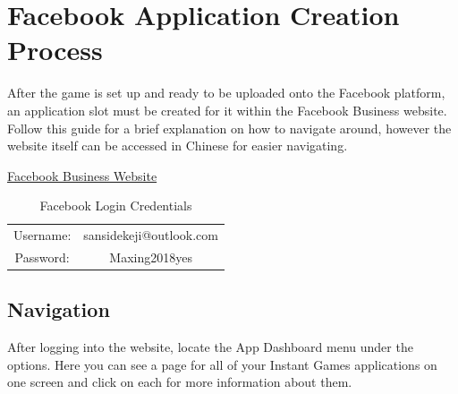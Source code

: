 \documentclass{article}
\begin{document}
\section{Facebook Application Creation Process}
After the game is set up and ready to be uploaded onto the Facebook platform, an application slot must be created for it within the Facebook Business website. Follow this guide for a brief explanation on how to navigate around, however the website itself can be accessed in Chinese for easier navigating.

\vspace{.2cm}
\begin{center}
\href{https://business.facebook.com}{Facebook Business Website}
\end{center}

\begin{table}[h]
\begin{center}
\begin{tabular}{c|c}
Username: \hspace{1cm} & sansidekeji@outlook.com \\
Password: \hspace{1cm} & Maxing2018yes 
\end{tabular}
\caption{Facebook Login Credentials}
\end{center}
\end{table}

\subsection{Navigation}
After logging into the website, locate the App Dashboard menu under the options. Here you can see a page for all of your Instant Games applications on one screen and click on each for more information about them.
\end{document}
